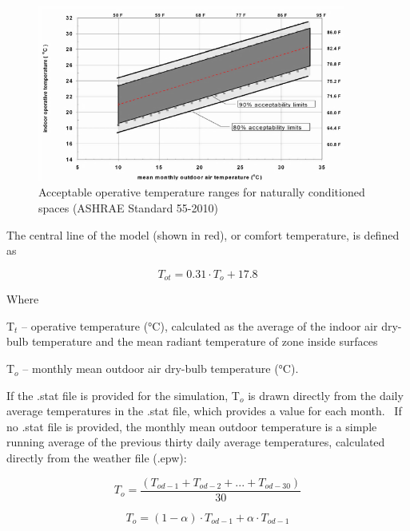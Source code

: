 \begin{figure}[hbtp] %
\centering
\includegraphics[width=0.9\textwidth, height=0.9\textheight, keepaspectratio=true]{media/image6814.png}
\caption{Acceptable operative temperature ranges for naturally conditioned spaces (ASHRAE Standard 55-2010) \protect \label{fig:acceptable-operative-temperature-ranges-for}}
\end{figure}

The central line of the model (shown in red), or comfort temperature, is defined as

\begin{equation}
{T_{ot}} = 0.31\cdot {T_o} + 17.8
\end{equation}

Where

T\(_{t}\) -- operative temperature (°C), calculated as the average of the indoor air dry-bulb temperature and the mean radiant temperature of zone inside surfaces

T\(_{o}\) -- monthly mean outdoor air dry-bulb temperature (°C).

If the .stat file is provided for the simulation, T\(_{o}\) is drawn directly from the daily average temperatures in the .stat file, which provides a value for each month.~ If no .stat file is provided, the monthly mean outdoor temperature is a simple running average of the previous thirty daily average temperatures, calculated directly from the weather file (.epw):

\begin{equation}
{T_o} = \frac{{\left( {{T_{od - 1}} + {T_{od - 2}} + ... + {T_{od - 30}}} \right)}}{{30}}
\end{equation}

\begin{equation}
{T_o} = (1 - \alpha )\cdot {T_{od - 1}} + \alpha \cdot {T_{od - 1}}
\end{equation}

